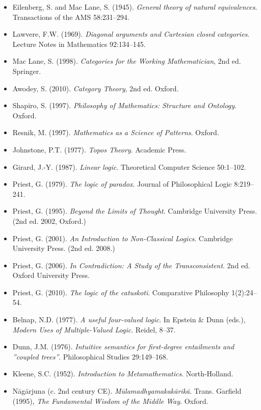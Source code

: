 \documentclass[12pt,a4paper]{article}
\begin{document}
\begin{itemize}
    \item Eilenberg, S. and Mac Lane, S. (1945). \emph{General theory of natural equivalences}. Transactions of the AMS 58:231--294.
    \item Lawvere, F.W. (1969). \emph{Diagonal arguments and Cartesian closed categories}. Lecture Notes in Mathematics 92:134--145.
    \item Mac Lane, S. (1998). \emph{Categories for the Working Mathematician}, 2nd ed. Springer.
    \item Awodey, S. (2010). \emph{Category Theory}, 2nd ed. Oxford.
    \item Shapiro, S. (1997). \emph{Philosophy of Mathematics: Structure and Ontology}. Oxford.
    \item Resnik, M. (1997). \emph{Mathematics as a Science of Patterns}. Oxford.
    \item Johnstone, P.T. (1977). \emph{Topos Theory}. Academic Press.
    \item Girard, J.-Y. (1987). \emph{Linear logic}. Theoretical Computer Science 50:1--102.
    \item Priest, G. (1979). \emph{The logic of paradox}. Journal of Philosophical Logic 8:219--241.
    \item Priest, G. (1995). \emph{Beyond the Limits of Thought}. Cambridge University Press. (2nd ed. 2002, Oxford.)
    \item Priest, G. (2001). \emph{An Introduction to Non-Classical Logics}. Cambridge University Press. (2nd ed. 2008.)
    \item Priest, G. (2006). \emph{In Contradiction: A Study of the Transconsistent}. 2nd ed. Oxford University Press.
    \item Priest, G. (2010). \emph{The logic of the catuskoti}. Comparative Philosophy 1(2):24--54.
    \item Belnap, N.D. (1977). \emph{A useful four-valued logic}. In Epstein \& Dunn (eds.), \emph{Modern Uses of Multiple-Valued Logic}. Reidel, 8--37.
    \item Dunn, J.M. (1976). \emph{Intuitive semantics for first-degree entailments and ''coupled trees''}. Philosophical Studies 29:149--168.
    \item Kleene, S.C. (1952). \emph{Introduction to Metamathematics}. North-Holland.
    \item N\={a}g\={a}rjuna (c. 2nd century CE). \emph{Mūlamadhyamakakārikā}. Trans. Garfield (1995), \emph{The Fundamental Wisdom of the Middle Way}. Oxford.

\end{itemize}
\end{document}
